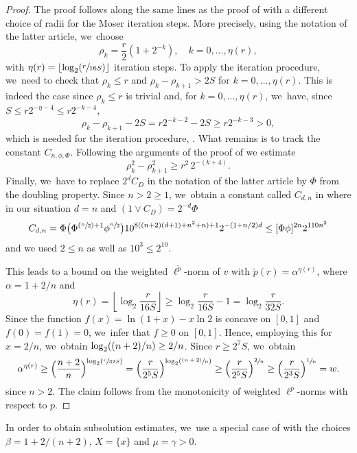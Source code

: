 \documentclass[10pt]{amsart}
\newcommand{\Psfrac}[2]{(\sfrac{#1}{#2})}
\newcommand{\Ppsfrac}[2]{(\sfrac{(#1)}{#2})}
\theoremstyle{plain}
\theoremstyle{definition}
\begin{document}
\begin{proof}
The proof follows along the same lines as the proof of \cite[Th.\,2.7]{KellerRose-22a} with a different choice of radii for the Moser iteration steps. More precisely, using the notation of the latter article, we~choose
\[
\rho_k=\frac{r}{2}(1+2^{-k}), \quad k= 0,\ldots, \eta(r),
\]
with $\eta(r)=\left\lfloor\log_2\Psfrac{r}{16S}\right\rfloor$ iteration steps. To apply the iteration procedure, we~need to check that $\rho_{k}\leq r$ and $ \rho_{k}-\rho_{k+1}>2S $ for $ k= 0,\ldots, \eta(r) $. This is indeed the case since $\rho_{k}\leq r$ is trivial and, for $ k= 0,\ldots, \eta(r)$, we~have, since $S\le r2^{-\eta-4}\leq r 2^{-k-4}$,
\[
\rho_k-\rho_{k+1}-2S={r}{2^{-k-2}}-2S\ge {r}{2^{-k-3}}>0,
\]
which is needed for the iteration procedure, \cf \cite[Prop.\,2.6]{KellerRose-22a}. What remains is to track the constant $C_{n,\phi,\Phi}$. Following the arguments of the proof of \cite[Th.\,2.7]{KellerRose-22a} we estimate
\[
\rho_k^2-\rho_{k+1}^2\geq r^2\,2^{-(k+4)}.
\]
Finally, we~have to replace $2^dC_D$ in the notation of the latter article by $\Phi$ from the doubling property. Since $n>2\geq 1$, we~obtain a constant called $ C_{d,n} $ in \cite[Th.\,2.7]{KellerRose-22a} where in our situation $ d=n $ and $ (1\vee C_{D})=2^{-d}\Phi $
\[
C_{d,n}=\Phi\bigl(\Phi^{\Psfrac{n}{2}+1}\phi^{\sfrac{n}{2}}\bigr)10^{8((n+2)(d+1)+n^2+n)+1}2^{-(1+n/2)d}
\leq [\Phi \phi]^{2n}2^{{{110}n^2}}
\]
and we used $ 2\le n $ as well as $ 10^{3}\leq 2^{10} $.

This leads to a bound on the weighted $\ell^{\tilde p}$-norm of $v$
with $\tilde p(r)=\alpha^{\eta(r)}$, where $\alpha=1+2/n$ and
\[
\eta(r)=\left\lfloor\log_2\frac{r}{16S}\right\rfloor\geq \log_2\frac{r}{16S}-1=\log_2\frac{r}{32S}.
\]
Since the function $f(x)=\ln(1+x)- x\ln 2$ is concave on $ [0,1] $ and \hbox{$ f(0)=f(1)=0 $}, we~infer that $ f \ge 0$ on $ [0,1] $. Hence, employing this for $ x=2/n $, we~obtain $\log_2((n+\nobreak2)/n)\geq 2/n$. Since $r\geq 2^7S$, we~obtain
\[
\alpha^{\eta(r)}\geq \Bigl({\frac{n+2}{n}}\Bigr)^{\log_2\Psfrac{r}{32S}}=\Bigl(\frac{r}{2^5S}\Bigr)^{\log_2\Ppsfrac{n+2}{n}}\geq \Bigl(\frac{r}{2^5S}\Bigr)^{\sfrac{2}{n}} \ge \Bigl(\frac{r}{2^{3}S}\Bigr)^{\sfrac{1}{n}}
= w.
\]
since $ n>2 $.
The claim follows from the monotonicity of weighted $\ell^p$-norms with respect to $p$.
\end{proof}

In order to obtain subsolution estimates, we~use a special case of \cite[Th.\,3.4]{KellerRose-22a} with the choices $\beta=1+2/(n+2)$, $X=\{x\}$ and $\mu=\gamma>0$.
\end{document}
